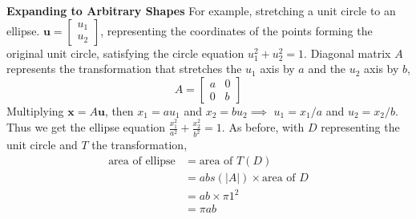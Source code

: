 \documentclass[../linear-algebra.tex]{subfiles}
\begin{document}
\vspace{0.5em}
\noindent \textbf{Expanding to Arbitrary Shapes}\newline
For example, stretching a unit circle to an ellipse.\newline
$\mathbf{u} = \begin{bmatrix} u_1 \\ u_2 \end{bmatrix}$, representing the coordinates of the points forming the original unit circle,
satisfying the circle equation $u_1^2 + u_2^2 = 1$.\newline
Diagonal matrix $A$ represents the transformation that stretches the $u_1$ axis by $a$ and the $u_2$ axis by $b$,
\[A = \begin{bmatrix} a & 0 \\ 0 & b \end{bmatrix}\]
Multiplying $\mathbf{x} = A\mathbf{u}$, then $x_1 = au_1$ and $x_2 = bu_2 \implies$ $u_1 = x_1/a$ and $u_2 = x_2/b$.
Thus we get the ellipse equation $\frac{x_1^2}{a^2} + \frac{x_2^2}{b^2} = 1$.\newline
As before, with $D$ representing the unit circle and $T$ the transformation,
\begin{align*}
    \text{area of ellipse} &= \text{area of }T(D) \\
    &= abs(|A|) \times \text{area of }D \\
    &= ab \times \pi 1^2 \\
    &= \pi ab
\end{align*}
\end{document}
